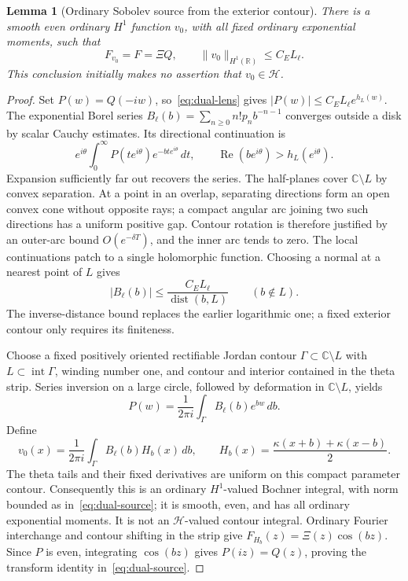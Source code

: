 \documentclass[11pt,a4paper]{article}
\numberwithin{equation}{section}
\newtheorem{lemma}[theorem]{Lemma}
\theoremstyle{definition}
\theoremstyle{remark}
\newcommand{\R}{\mathbb R}
\newcommand{\C}{\mathbb C}
\newcommand{\Hh}{\mathcal H}
\newcommand{\norm}[1]{\lVert #1\rVert}
\begin{document}
\begin{lemma}[Ordinary Sobolev source from the exterior contour]\label{lem:dual-source}
There is a smooth even ordinary $H^1$ function $v_0$, with all fixed ordinary exponential moments, such that
\begin{equation}\label{eq:dual-source}
 F_{v_0}=F=\Xi Q,\qquad
 \norm{v_0}_{H^1(\R)}\le C_E L_\ell.
\end{equation}
This conclusion initially makes no assertion that $v_0\in\Hh$.
\end{lemma}
\begin{proof}
Set $P(w)=Q(-iw)$, so~\eqref{eq:dual-lens} gives
$|P(w)|\le C_E L_\ell e^{h_L(w)}$.
The exponential Borel series $B_\ell(b)=\sum_{n\ge0}n!p_nb^{-n-1}$ converges outside a disk by scalar Cauchy estimates. Its directional continuation is
\[
 e^{i\theta}\int_0^\infty
       P(te^{i\theta})e^{-bte^{i\theta}}\,dt,
 \qquad\operatorname{Re}(be^{i\theta})>h_L(e^{i\theta}).
\]
Expansion sufficiently far out recovers the series. The half-planes cover $\C\setminus L$ by convex separation. At a point in an overlap, separating directions form an open convex cone without opposite rays; a compact angular arc joining two such directions has a uniform positive gap. Contour rotation is therefore justified by an outer-arc bound $O(e^{-\delta T})$, and the inner arc tends to zero. The local continuations patch to a single holomorphic function. Choosing a normal at a nearest point of $L$ gives
\begin{equation}\label{eq:dual-Borel}
 |B_\ell(b)|\le\frac{C_E L_\ell}{\operatorname{dist}(b,L)}
 \qquad(b\notin L).
\end{equation}
The inverse-distance bound replaces the earlier logarithmic one; a fixed exterior contour only requires its finiteness.

Choose a fixed positively oriented rectifiable Jordan contour $\Gamma\subset\C\setminus L$ with $L\subset\operatorname{int}\Gamma$, winding number one, and contour and interior contained in the theta strip. Series inversion on a large circle, followed by deformation in $\C\setminus L$, yields
\[
 P(w)=\frac1{2\pi i}\int_\Gamma B_\ell(b)e^{bw}\,db.
\]
Define
\begin{equation}\label{eq:dual-contour-source}
 v_0(x)=\frac1{2\pi i}\int_\Gamma B_\ell(b)H_b(x)\,db,
 \qquad H_b(x)=\frac{\kappa(x+b)+\kappa(x-b)}2.
\end{equation}
The theta tails and their fixed derivatives are uniform on this compact parameter contour. Consequently this is an ordinary $H^1$-valued Bochner integral, with norm bounded as in~\eqref{eq:dual-source}; it is smooth, even, and has all ordinary exponential moments. It is not an $\Hh$-valued contour integral. Ordinary Fourier interchange and contour shifting in the strip give $F_{H_b}(z)=\Xi(z)\cos(bz)$. Since $P$ is even, integrating $\cos(bz)$ gives $P(iz)=Q(z)$, proving the transform identity in~\eqref{eq:dual-source}.
\end{proof}
\end{document}
